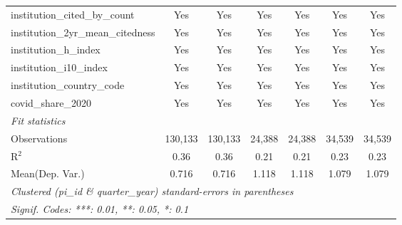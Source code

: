 \begin{tabular}{lcccccc}
   institution\_cited\_by\_count                               & Yes            & Yes            & Yes           & Yes           & Yes            & Yes\\  
   institution\_2yr\_mean\_citedness                           & Yes            & Yes            & Yes           & Yes           & Yes            & Yes\\  
   institution\_h\_index                                       & Yes            & Yes            & Yes           & Yes           & Yes            & Yes\\  
   institution\_i10\_index                                     & Yes            & Yes            & Yes           & Yes           & Yes            & Yes\\  
   institution\_country\_code                                  & Yes            & Yes            & Yes           & Yes           & Yes            & Yes\\  
   covid\_share\_2020                                          & Yes            & Yes            & Yes           & Yes           & Yes            & Yes\\  
   \midrule
   \emph{Fit statistics}\\
   Observations                                                & 130,133        & 130,133        & 24,388        & 24,388        & 34,539         & 34,539\\  
   R$^2$                                                       & 0.36           & 0.36           & 0.21          & 0.21          & 0.23           & 0.23\\  
Mean(Dep. Var.) & 0.716 & 0.716 & 1.118 & 1.118 & 1.079 & 1.079 \\
   \midrule \midrule
   \multicolumn{7}{l}{\emph{Clustered (pi\_id \& quarter\_year) standard-errors in parentheses}}\\
   \multicolumn{7}{l}{\emph{Signif. Codes: ***: 0.01, **: 0.05, *: 0.1}}\\
\end{tabular}
\par\endgroup
